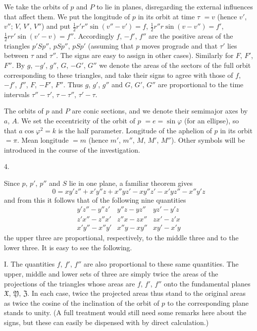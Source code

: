 We take the orbits of $p$ and $P$ to lie in planes, disregarding the external influences that affect them. We put the longitude of $p$ in its orbit at time $\tau$ $=v$ (hence $v'$, $v''$; $V$, $V'$, $V''$) and put $\frac12r'r''\sin(v''-v')=f$, $\frac12r''r\sin(v-v'')=f'$, $\frac12rr'\sin(v'-v)=f''$. Accordingly $f$, $-f'$, $f''$ are the positive areas of the triangles $p'Sp''$, $pSp''$, $pSp'$ (assuming that $p$ moves prograde and that $\tau'$ lies between $\tau$ and $\tau''$. The signs are easy to assign in other cases). Similarly for $F$, $F'$, $F''$. By $g$, $-g'$, $g''$, $G$, $-G'$, $G''$ we denote the areas of the sectors of the full orbit corresponding to these triangles, and take their signs to agree with those of $f$, $-f'$, $f''$, $F$, $-F'$, $F''$. Thus $g$, $g'$, $g''$ and $G$, $G'$, $G''$ are proportional to the time intervals $\tau''-\tau'$, $\tau-\tau''$, $\tau'-\tau$.

%
The orbits of $p$ and $P$ are conic sections, and we denote their semimajor axes by $a$, $A$. We set the eccentricity of the orbit of $p$ $=e=\sin\varphi$ (for an ellipse), so that $a\cos\varphi^2=k$ is the half parameter. Longitude of the aphelion of $p$ in its orbit $=\pi$. Mean longitude $=m$ (hence $m'$, $m''$, $M$, $M'$, $M''$). Other symbols will be introduced in the course of the investigation.

\begin{center}4.\end{center}
Since $p$, $p'$, $p''$ and $S$ lie in one plane, a familiar theorem gives
\[
0=xy'z''+x'y''z+x''yz'-xy''z'-x'yz''-x''y'z
\]
and from this it follows that of the following nine quantities
\[
\begin{array}{ccc}
y'z''-y''z'&y''z-yz''&yz'-y'z\\
z'x''-z''x'&z''x-zx''&zx'-z'x\\
x'y''-x''y'&x''y-xy''&xy'-x'y
\end{array}
\]
the upper three are proportional, respectively, to the middle three and to the lower three. It is easy to see the following.

I. The quantities $f$, $f'$, $f''$ are also proportional to these same quantities. The upper, middle and lower sets of three are simply twice the areas of the projections of the triangles whose areas are $f$, $f'$, $f''$ onto the fundamental planes $\mathfrak{X}$, $\mathfrak{Y}$, $\mathfrak{Z}$. In each case, twice the projected areas thus stand to the original areas as twice the cosine of the inclination of the orbit of $p$ to the corresponding plane stands to unity. (A full treatment would still need some remarks here about the signs, but these can easily be dispensed with by direct calculation.)

